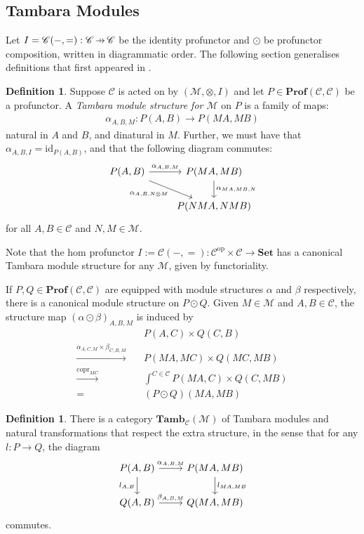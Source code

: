 \documentclass[11pt,a4paper]{article}
\theoremstyle{plain}
\theoremstyle{definition}
\newtheorem{definition}[theorem]{Definition}
\newcommand{\C}{\mathscr{C}}
\newcommand{\M}{\mathscr{M}}
\newcommand{\Set}{\mathbf{Set}}
\newcommand{\Prof}{\mathbf{Prof}}
\newcommand{\Tamb}{\mathbf{Tamb}}
\newcommand{\id}{\mathrm{id}}
\newcommand{\op}{\mathrm{op}}
\DeclareMathOperator{\copr}{copr}
\newcommand{\hto}{\ensuremath{\,\mathaccent\shortmid\rightarrow\,}}
\begin{document}
\subsection{Tambara Modules}
Let $I = \C(-,{=}) : \C \hto \C$ be the identity profunctor and $\odot$ be profunctor composition, written in diagrammatic order. The following section generalises definitions that first appeared in \cite{Doubles}.
\begin{definition}
Suppose $\C$ is acted on by $(\M, \otimes, I)$ and let $P \in \Prof(\C, \C)$ be a profunctor. A \emph{Tambara module structure for $\M$} on $P$ is a family of maps:
\begin{align*}
\alpha_{A,B,M} : P(A,B) \to P(MA, MB)
\end{align*}
natural in $A$ and $B$, and dinatural in $M$. Further, we must have that $\alpha_{A,B,I} = \id_{P(A,B)}$, and that the following diagram commutes:
\[
\begin{tikzcd}
P(A,B) \ar[r, "\alpha_{A,B,M}"] \ar[dr, "\alpha_{A, B, N \otimes M}" below left] & P(MA, MB) \ar[d, "\alpha_{MA, MB, N}" right] \\
& P(NMA, NMB)
\end{tikzcd}
\]
for all $A, B \in \C$ and $N, M \in \M$.
\end{definition}

Note that the hom profunctor $I := \C(-, =) : \C^\op \times \C \to \Set$ has a canonical Tambara module structure for any $\M$, given by functoriality.

If $P, Q \in \Prof(\C, \C)$ are equipped with module structures $\alpha$ and $\beta$ respectively, there is a canonical module structure on $P \odot Q$. Given $M \in \M$ and $A,B \in \C$, the structure map $(\alpha \odot \beta)_{A,B,M}$ is induced by
\begin{align*}
&P(A,C) \times Q(C,B)  \\
\xrightarrow{\alpha_{A,C,M} \times \beta_{C,B,M}} \quad& P(MA, MC) \times Q(MC, MB) \\
\xrightarrow{\copr_{MC}} \quad&\int^{C \in \C} P(MA, C) \times Q(C, MB) \\
= \quad&(P \odot Q)(MA, MB)
\end{align*}

\begin{definition}
There is a category $\Tamb_\C(\M)$ of Tambara modules and natural transformations that respect the extra structure, in the sense that for any $l : P \to Q$, the diagram
\[
\begin{tikzcd}
P(A,B) \ar[r, "\alpha_{A,B,M}"] \ar[d, "l_{A,B}" left] & P(MA, MB) \ar[d, "l_{MA, MB}" right] \\
Q(A,B) \ar[r, "\beta_{A,B,M}"] & Q(MA, MB)
\end{tikzcd}
\]
commutes.
\end{definition}
\end{document}
